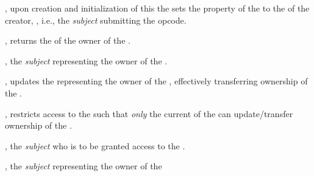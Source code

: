 \begin{code}
  \item \operations

  \begin{constructor}
    \item {}, upon creation and initialization of this
       the  sets the 
      property of the  to the  of the
       creator, , i.e., the \emph{subject}
      submitting the  opcode.
  \end{constructor}

  \begin{functions}
    \item {}, returns the  of the owner of
      the .

      \begin{returns}
        \item {}, the \emph{subject} representing the owner of
          the .
      \end{returns}

    \item {}, updates the 
      representing the owner of the , effectively transferring
      ownership of the .

      \begin{modifiers}
        \item {}, restricts access to the
           such that \emph{only} the current  of the
           can update/transfer ownership of the .
      \end{modifiers}

      \begin{parameters}
        \item {}, the \emph{subject} who is to be granted access
          to the .
      \end{parameters}

      \begin{returns}
        \item {}, the \emph{subject} representing the owner of
          the 
      \end{returns}
  \end{functions}
\end{code}

